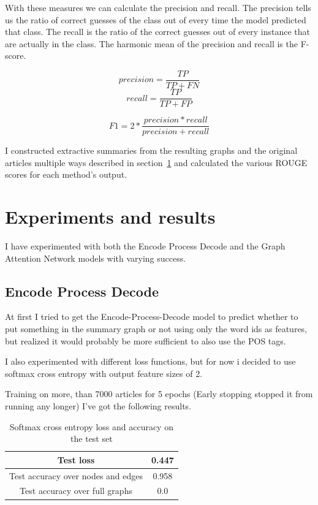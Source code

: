 With these measures we can calculate the precision and recall. The precision tells us the ratio of correct guesses of the class out of every time the model predicted that class. The recall is the ratio of the correct guesses out of every instance that are actually in the class. The harmonic mean of the precision and recall is the F-score.

\[precision = \frac{TP}{TP + FN}\]
\[recall = \frac{TP}{TP + FP}\]

\[F1 = 2 * \frac{precision * recall}{precision + recall}\]

I constructed extractive summaries from the resulting graphs and the original articles multiple ways described in section~\ref{ssect:ExperimnetsAndResults} and calculated the various ROUGE scores for each method's output.

\section{Experiments and results}\label{ssect:ExperimnetsAndResults}
I have experimented with both the Encode Process Decode and the Graph Attention Network models with varying success.
\subsection{Encode Process Decode}
At first I tried to get the Encode-Process-Decode model to predict whether to put something in the summary graph or not using only the word ids as features, but realized it would probably be more sufficient to also use the POS tags.

I also experimented with different loss functions, but for now i decided to use softmax cross entropy with output feature sizes of 2.

Training on more, than 7000 articles for 5 epochs (Early stopping stopped it from running any longer) I've got the following results.
\begin{table}[!h]
	\centering
	\begin{tabular}{| c | c |}
		\hline
		Test loss & 0.447 \\ \hline
		Test accuracy over nodes and edges & 0.958 \\ \hline
		Test accuracy over full graphs & 0.0 \\ \hline
	\end{tabular}
	\caption{Softmax cross entropy loss and accuracy on the test set}
\end{table}

